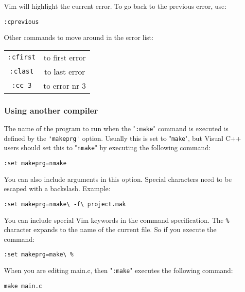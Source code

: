 Vim will highlight the current error.
To go back to the previous error, use:

\begin{Verbatim}[samepage=true]
 :cprevious
\end{Verbatim}

Other commands to move around in the error list:

\begin{center} \begin{tabular}{c c}
				\verb!:cfirst! & to first error \\
				\verb!:clast! & to last error \\
				\verb!:cc 3! & to error nr 3 \\
\end{tabular} \end{center}

\subsubsection{Using another compiler}
The name of the program to run when the "\verb!:make!" command is executed is defined by the \verb!'makeprg'! option.
Usually this is set to "\verb!make!", but Visual C++ users should set this to "\verb!nmake!" by executing the following command:

\begin{Verbatim}[samepage=true]
 :set makeprg=nmake
\end{Verbatim}

You can also include arguments in this option.
Special characters need to be escaped with a backslash.
Example:

\begin{Verbatim}[samepage=true]
 :set makeprg=nmake\ -f\ project.mak
\end{Verbatim}

You can include special Vim keywords in the command specification.
The \verb!%! character expands to the name of the current file.
So if you execute the command:

\begin{Verbatim}[samepage=true]
 :set makeprg=make\ %
\end{Verbatim}

When you are editing main.c, then "\verb!:make!" executes the following command:

\begin{Verbatim}[samepage=true]
 make main.c
\end{Verbatim}

